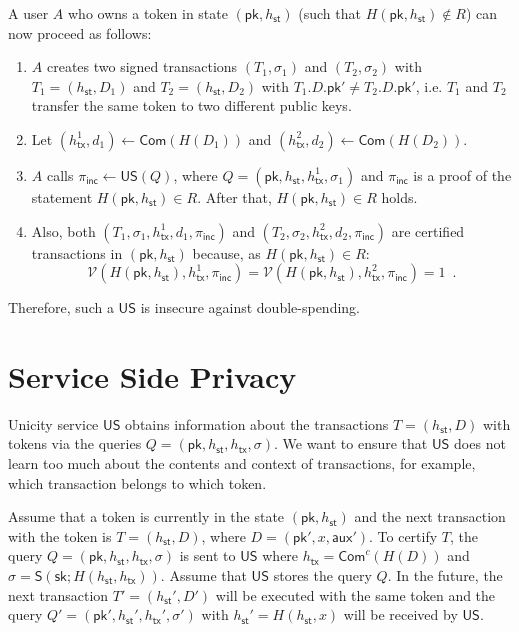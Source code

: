 \documentclass{article}
\newcommand{\sig}[0]{\mathsf{S}}
\newcommand{\pubkey}[0]{\mathsf{pk}}
\newcommand{\prikey}[0]{\mathsf{sk}}
\newcommand{\commit}[0]{\mathsf{Com}}
\newcommand{\commitc}[0]{\mathsf{Com}^{c}}
\newcommand{\unisrv}[0]{\mathsf{US}}
\newcommand{\sthash}[0]{h_\mathsf{st}}
\newcommand{\txhash}[0]{h_\mathsf{tx}}
\newcommand{\auxd}[0]{\mathsf{aux}}
\newcommand{\univer}[0]{\mathcal{V}}
\newcommand{\pinc}[0]{\pi_{\mathsf{inc}}}
\begin{document}
\noindent A user $A$ who owns a token in state $(\pubkey,\sthash)$ (such that $H(\pubkey,\sthash)\not\in R$) can now proceed as follows:
\begin{enumerate}
\item $A$ creates two signed transactions $(T_1,\sigma_1)$ and $(T_2,\sigma_2)$ with
$T_1=(\sthash,D_1)$ and $T_2=(\sthash,D_2)$ with $T_1.D.\pubkey'\neq T_2.D.\pubkey'$, i.e. $T_1$ and $T_2$ transfer the same token to two different public keys.
\item Let $(\txhash^1,d_1)\gets \commit(H(D_1))$ and $(\txhash^2,d_2)\gets \commit(H(D_2))$.
\item $A$ calls $\pinc\gets\unisrv(Q)$, where $Q=(\pubkey,\sthash,\txhash^1,\sigma_1)$ and $\pinc$ is a proof of the statement $H(\pubkey,\sthash)\in R$. After that, $H(\pubkey,\sthash)\in R$ holds.
\item Also, both $(T_1,\sigma_1,\txhash^1,d_1, \pinc)$ and $(T_2,\sigma_2,\txhash^2,d_2, \pinc)$ are certified transactions in $(\pubkey,\sthash)$ because, as $H(\pubkey,\sthash)\in R$:
\[
\univer(H(\pubkey,\sthash),\txhash^1,\pinc)=
\univer(H(\pubkey,\sthash),\txhash^2,\pinc)=1\enspace.
\]
\end{enumerate}

\noindent Therefore, such a $\unisrv$ is insecure against double-spending.

\section{Service Side Privacy}

Unicity service $\unisrv$ obtains information about the transactions $T=(\sthash,D)$ with tokens via the queries $Q=(\pubkey, \sthash, \txhash,\sigma)$. We want to ensure that $\unisrv$ does not learn too much about the contents and context of transactions, for example, which transaction belongs to which token.

Assume that a token is currently in the state $(\pubkey,\sthash)$ and the next transaction with the token is $T=(\sthash, D)$, where $D=(\pubkey',x,\auxd')$. To certify $T$, the query
$Q=(\pubkey,\sthash,\txhash,\sigma)$ is sent to $\unisrv$ where $\txhash=\commitc(H(D))$ and $\sigma = \sig(\prikey; H(\sthash,\txhash))$.
Assume that $\unisrv$ stores the query $Q$.
In the future, the next transaction $T'=(\sthash',D')$ will be executed with the same token and the query
$Q'=(\pubkey',\sthash',\txhash',\sigma')$ with $\sthash'=H(\sthash,x)$ will be received by $\unisrv$.
\end{document}
